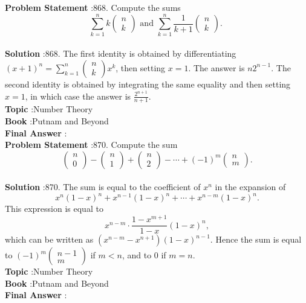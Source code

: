 \documentclass[10pt]{article}
\begin{document}
\textbf{Problem Statement} :868. Compute the sums$$ \sum_{k=1}^{n} k\left(\begin{array}{l} n \\ k \end{array}\right) \text { and } \sum_{k=1}^{n} \frac{1}{k+1}\left(\begin{array}{l} n \\ k \end{array}\right) \text {. } $$\\
\textbf{Solution} :868. The first identity is obtained by differentiating $(x+1)^{n}=\sum_{k=1}^{n}\left(\begin{array}{c}n \\ k\end{array}\right) x^{k}$, then setting $x=1$. The answer is $n 2^{n-1}$. The second identity is obtained by integrating the same equality and then setting $x=1$, in which case the answer is $\frac{2^{n+1}}{n+1}$.\\
\textbf{Topic} :Number Theory\\
\textbf{Book} :Putnam and Beyond\\
\textbf{Final Answer} :\\


\textbf{Problem Statement} :870. Compute the sum$$ \left(\begin{array}{l} n \\ 0 \end{array}\right)-\left(\begin{array}{l} n \\ 1 \end{array}\right)+\left(\begin{array}{l} n \\ 2 \end{array}\right)-\cdots+(-1)^{m}\left(\begin{array}{l} n \\ m \end{array}\right) . $$\\
\textbf{Solution} :870. The sum is equal to the coefficient of $x^{n}$ in the expansion of$$ x^{n}(1-x)^{n}+x^{n-1}(1-x)^{n}+\cdots+x^{n-m}(1-x)^{n} . $$This expression is equal to$$ x^{n-m} \cdot \frac{1-x^{m+1}}{1-x}(1-x)^{n}, $$which can be written as $\left(x^{n-m}-x^{n+1}\right)(1-x)^{n-1}$. Hence the sum is equal to $(-1)^{m}\left(\begin{array}{c}n-1 \\ m\end{array}\right)$ if $m<n$, and to 0 if $m=n$.\\
\textbf{Topic} :Number Theory\\
\textbf{Book} :Putnam and Beyond\\
\textbf{Final Answer} :\\
\end{document}
